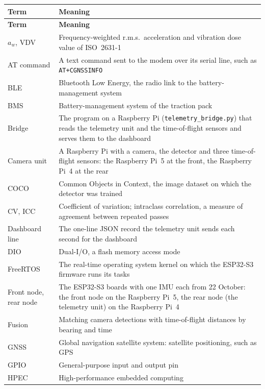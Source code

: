 \documentclass[a4paper,11pt]{report}
\begin{document}
{{\small
\begin{longtable}{|>{\raggedright\arraybackslash}p{2.6cm}|>{\raggedright\arraybackslash}p{11.2cm}|}
\hline
\textbf{Term} & \textbf{Meaning} \\ \hline
\endfirsthead
\hline
\textbf{Term} & \textbf{Meaning} \\ \hline
\endhead
$a_w$, VDV & Frequency-weighted r.m.s.\ acceleration and vibration dose value of ISO~2631-1 \\ \hline
AT command & A text command sent to the modem over its serial line, such as \texttt{AT+CGNSSINFO} \\ \hline
BLE & Bluetooth Low Energy, the radio link to the battery-management system \\ \hline
BMS & Battery-management system of the traction pack \\ \hline
Bridge & The program on a Raspberry Pi (\texttt{telemetry\_bridge.py}) that reads the telemetry unit and the time-of-flight sensors and serves them to the dashboard \\ \hline
Camera unit & A Raspberry Pi with a camera, the detector and three time-of-flight sensors: the Raspberry Pi~5 at the front, the Raspberry Pi~4 at the rear \\ \hline
COCO & Common Objects in Context, the image dataset on which the detector was trained \\ \hline
CV, ICC & Coefficient of variation; intraclass correlation, a measure of agreement between repeated passes \\ \hline
Dashboard line & The one-line JSON record the telemetry unit sends each second for the dashboard \\ \hline
DIO & Dual-I/O, a flash memory access mode \\ \hline
FreeRTOS & The real-time operating system kernel on which the ESP32-S3 firmware runs its tasks \\ \hline
Front node, rear node & The ESP32-S3 boards with one IMU each from 22 October: the front node on the Raspberry Pi~5, the rear node (the telemetry unit) on the Raspberry Pi~4 \\ \hline
Fusion & Matching camera detections with time-of-flight distances by bearing and time \\ \hline
GNSS & Global navigation satellite system: satellite positioning, such as GPS \\ \hline
GPIO & General-purpose input and output pin \\ \hline
HPEC & High-performance embedded computing \\ \hline

\end{longtable}}}
\end{document}
